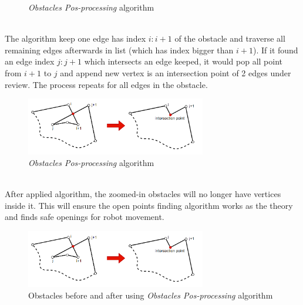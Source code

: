 \documentclass[13pt,a4paper]{article}
\begin{document}
\begin{itemize}
\begin{figure}[!h]
					\caption{\textit{Obstacles Pos-processing} algorithm}
				\end{figure} \\
				The algorithm keep one edge has index $i:i+1$ of the obstacle and traverse all remaining edges afterwards in list (which has index bigger than $i+1$). If it found an edge index $j:j+1$ which intersects an edge keeped, it would pop all point from $i+1$ to $j$ and append new vertex is an intersection point of 2 edges under review. The process repeats for all edges in the obstacle.\\
				\begin{figure}[!h]
					\centering                                 \includegraphics[width=0.7\textwidth]{Robot_Global_Vision_Update/RGVU_posprocess_before_after_pop.png}
					\caption{\textit{Obstacles Pos-processing} algorithm}
				\end{figure} \\
				After applied algorithm, the zoomed-in obstacles will no longer have vertices inside it. This will ensure the open points finding algorithm works as the theory and finds safe openings for robot movement.
				\begin{figure}[!h]
					\centering                                 \includegraphics[width=0.7\textwidth]{Robot_Global_Vision_Update/RGVU_posprocess_before_after_pop.png}
					\caption{Obstacles before and after using \textit{Obstacles Pos-processing} algorithm}
				\end{figure} \\
			\end{itemize}
		
			
	
\end{document}
